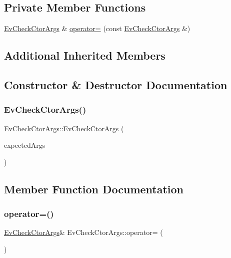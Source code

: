 \subsection*{Private Member Functions}
\begin{DoxyCompactItemize}
\item 
\mbox{\hyperlink{struct_ev_check_ctor_args}{Ev\+Check\+Ctor\+Args}} \& \mbox{\hyperlink{struct_ev_check_ctor_args_a64afdb759f97f3675e6e2a38c2d75291}{operator=}} (const \mbox{\hyperlink{struct_ev_check_ctor_args}{Ev\+Check\+Ctor\+Args}} \&)
\end{DoxyCompactItemize}
\subsection*{Additional Inherited Members}


\subsection{Constructor \& Destructor Documentation}
\mbox{\label{struct_ev_check_ctor_args_aa45ad084e2237206f2646ac82ff56444}} 
\subsubsection{\texorpdfstring{Ev\+Check\+Ctor\+Args()}{EvCheckCtorArgs()}}
{\footnotesize\ttfamily Ev\+Check\+Ctor\+Args\+::\+Ev\+Check\+Ctor\+Args (\begin{DoxyParamCaption}\item[{int}]{expected\+Args }\end{DoxyParamCaption})\hspace{0.3cm}{\ttfamily [inline]}}



\subsection{Member Function Documentation}
\mbox{\label{struct_ev_check_ctor_args_a64afdb759f97f3675e6e2a38c2d75291}} 
\subsubsection{\texorpdfstring{operator=()}{operator=()}}
{\footnotesize\ttfamily \mbox{\hyperlink{struct_ev_check_ctor_args}{Ev\+Check\+Ctor\+Args}}\& Ev\+Check\+Ctor\+Args\+::operator= (\begin{DoxyParamCaption}\item[{const \mbox{\hyperlink{struct_ev_check_ctor_args}{Ev\+Check\+Ctor\+Args}} \&}]{ }\end{DoxyParamCaption})\hspace{0.3cm}{\ttfamily [private]}}



